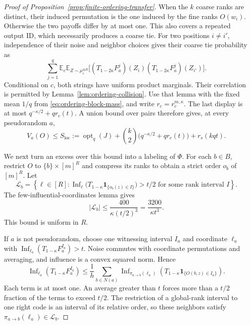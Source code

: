 \begin{proof}[Proof of Proposition~\ref{prop:finite-ordering-transfer}]
When the \(k\) coarse ranks are distinct, their induced permutation
is the one induced by the fine ranks \(O(w_i)\).  Otherwise the two
payoffs differ by at most one.  This also covers a repeated output ID,
which necessarily produces a coarse tie.  For two positions \(i\ne i'\),
independence of their noise and neighbor choices gives their coarse
tie probability as
\[
 \sum_{j=1}^q
 \mathbb E_c\mathbb E_{Z\sim\mu_c^{\otimes R}}
 \bigl[
  (T_{1-2\kappa}F_a^j)(Z_i)
  (T_{1-2\kappa}F_a^j)(Z_{i'})
 \bigr].
\]
Conditional on \(c\), both strings have uniform product marginals.
Their correlation is permitted by
Lemma~\ref{lem:ordering-collision}.  Use that lemma with the fixed
mean \(1/q\) from \eqref{eq:ordering-block-mass}, and write
\(r_c=r_c^{m,\kappa}\).  The last display is at most
\(q^{-\kappa/2}+q r_c(t)\).  A union bound over pairs therefore gives,
at every pseudorandom \(a\),
\begin{equation}
 V_a(O)\le
 S_{\mathrm{loc}}:=\operatorname{opt}_q(J)
 +\binom{k}{2}\bigl(q^{-\kappa/2}+q r_c(t)\bigr)
 +r_s(kqt).
\label{eq:ordering-pseudorandom-bound}
\end{equation}

We next turn an excess over this bound into a labeling of \(\Phi\).
For each \(b\in B\), restrict \(O\) to
\(\{b\}\times[m]^R\) and compress its ranks to obtain a strict order
\(o_b\) of \([m]^R\).  Let
\[
 \mathcal L_b=\left\{\ell\in[R]:
   \operatorname{Inf}_\ell
    \bigl(T_{1-\kappa}\mathbf1_{\{o_b(z)\in I\}}\bigr)>t/2
   \text{ for some rank interval }I\right\}.
\]
The few-influential-coordinates lemma
\cite[Definition~4.2 and Lemma~4.3]{GuruswamiEtAl2011OrderingCSP}
gives
\begin{equation}
 |\mathcal L_b|\le\frac{400}{\kappa(t/2)^3}
 =\frac{3200}{\kappa t^3}.
\label{eq:ordering-right-candidates}
\end{equation}
This bound is uniform in \(R\).

If \(a\) is not pseudorandom, choose one witnessing interval \(I_a\)
and coordinate \(\ell_a\) with
\(\operatorname{Inf}_{\ell_a}(T_{1-\kappa}F_a^{I_a})>t\).
Noise commutes with coordinate permutations and averaging, and
influence is a convex squared norm.  Hence
\begin{equation}
 \operatorname{Inf}_{\ell_a}(T_{1-\kappa}F_a^{I_a})
 \le\frac1h\sum_{b\in N(a)}
 \operatorname{Inf}_{\pi_{a\to b}(\ell_a)}
 \left(T_{1-\kappa}
       \mathbf1_{\{O(b,z)\in I_a\}}\right).
\label{eq:ordering-influence-average}
\end{equation}
Each term is at most one.  An average greater than \(t\) forces more
than a \(t/2\) fraction of the terms to exceed \(t/2\).
The restriction of a global-rank interval to one right code is an
interval of its relative order, so these neighbors satisfy
\(\pi_{a\to b}(\ell_a)\in\mathcal L_b\).


\end{proof}
